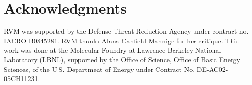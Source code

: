 \documentclass[fleqn,10pt]{wlpeerj} %
\begin{document}
\section*{Acknowledgments}

RVM was supported by the Defense Threat Reduction Agency under contract no. IACRO-B0845281. RVM thanks Alana Canfield Mannige for her critique. This work was done at the Molecular Foundry at Lawrence Berkeley National Laboratory (LBNL), supported by the Office of Science, Office of Basic Energy Sciences, of the U.S. Department of Energy under Contract No. DE-AC02-05CH11231.


\end{document}
